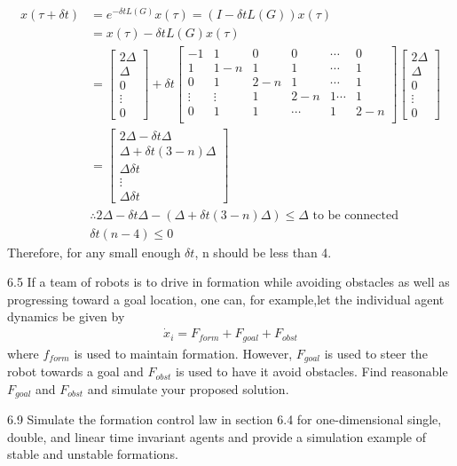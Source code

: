 \documentclass{article}
\begin{document}
\begin{problem}
    \begin{align*}
        x (\tau + \delta t) &= e^{-\delta t L(G)}  x(\tau) =(I - \delta t L(G))x(\tau)\\
        &=x(\tau) - \delta t L(G) x(\tau)\\
        &= \begin{bmatrix*}
            2 \Delta \\
            \Delta\\
            0\\
            \vdots\\
            0
        \end{bmatrix*} + 
        \delta t \begin{bmatrix*}
            -1 & 1 & 0 & 0 & \cdots &0 \\
             1 & 1-n & 1 & 1 & \cdots & 1\\
             0 & 1 & 2-n & 1 & \cdots & 1 \\
             \vdots & \vdots & 1&2-n &1 \cdots &1\\
             0& 1&1&\cdots &1&2-n\\
        \end{bmatrix*} 
        \begin{bmatrix*}
            2 \Delta \\
            \Delta\\
            0\\
            \vdots\\
            0
        \end{bmatrix*} \\
        &= \begin{bmatrix*}
            2\Delta - \delta t \Delta\\
            \Delta +  \delta t (3-n)\Delta\\
            \Delta \delta t\\
            \vdots\\
            \Delta \delta t
        \end{bmatrix*}\\
        &\therefore 2\Delta - \delta t \Delta -(\Delta +  \delta t (3-n)\Delta) \leq \Delta \text{ to be connected}\\
        &\delta t (n-4) \leq 0
    \end{align*} 
    Therefore, for any small enough $\delta t$, n should be less than 4. 
\end{problem}
\begin{problem}6.5
    If a team of robots is to drive in formation while avoiding obstacles as well as progressing toward a goal location, one can, for example,let the individual agent dynamics be given by
    \begin{align*}
        \dot x_i = F_{form} + F_{goal} + F_{obst}
    \end{align*}
    where $f_{form}$ is used to maintain formation. However, $F_{goal}$ is used to steer the robot towards a goal and $F_{obst}$ is used to have it avoid obstacles. Find reasonable $F_{goal}$ and $F_{obst}$ and simulate your proposed solution. 
\end{problem}
\begin{problem} 6.9
    Simulate the formation control law in section 6.4 for one-dimensional
    single, double, and linear time invariant agents and provide a simulation example of stable and unstable formations.
\end{problem}
\end{document}
